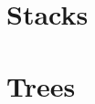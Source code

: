 \documentclass{report}
\begin{document}
	\section{Stacks}
	\startsection
	\closesection
	
	\section{Trees}
	\startsection
	\closesection
\end{document}
